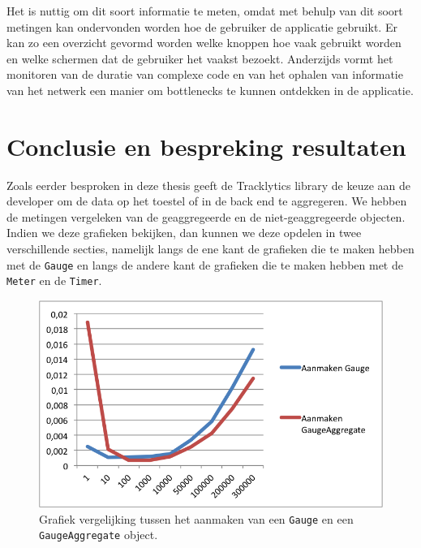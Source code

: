 Het is nuttig om dit soort informatie te meten, omdat met behulp van dit soort metingen kan ondervonden worden hoe de gebruiker de applicatie gebruikt. Er kan zo een overzicht gevormd worden welke knoppen hoe vaak gebruikt worden en welke schermen dat de gebruiker het vaakst bezoekt. Anderzijds vormt het monitoren van de duratie van complexe code en van het ophalen van informatie van het netwerk een manier om bottlenecks te kunnen ontdekken in de applicatie. 

\section{Conclusie en bespreking resultaten}\label{Section:Conclusie}
Zoals eerder besproken in deze thesis geeft de Tracklytics library de keuze aan de developer om de data op het toestel of in de back end te aggregeren. We hebben de metingen vergeleken van de geaggregeerde en de niet-geaggregeerde objecten. Indien we deze grafieken bekijken, dan kunnen we deze opdelen in twee verschillende secties, namelijk langs de ene kant de grafieken die te maken hebben met de \texttt{Gauge} en langs de andere kant de grafieken die te maken hebben met de \texttt{Meter} en de \texttt{Timer}. \\


\begin{figure}[h]
  \centering
  \includegraphics[scale=1.0]{Afbeeldingen/Evaluatie/GaugeVSAggregate}
  \caption{Grafiek vergelijking tussen het aanmaken van een \texttt{Gauge} en een \texttt{GaugeAggregate} object.}
  \label{fig:GaugeVSAggregate}
\end{figure}

